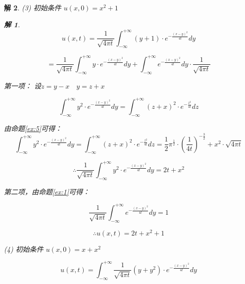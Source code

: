 \documentclass[12pt,a4paper]{article}
\newtheorem*{solution}{解}
\begin{document}
\begin{solution}
	
(3) 初始条件 \( u(x,0) = x^2 + 1 \)
			\begin{solution}
	
\begin{equation*}
 u(x,t)=\frac{1}{\sqrt{4\pi t}}\int_{-\infty}^{+\infty}(y+1)\cdot e^{-\frac{(x-y)^2}{4t}}dy
\end{equation*}

\begin{equation*}
	=\frac{1}{\sqrt{4\pi t}}\int_{-\infty}^{+\infty} y\cdot e^{-\frac{(x-y)^2}{4t}}dy+\int_{-\infty}^{+\infty} e^{-\frac{(x-y)^2}{4t}}dy\cdot \frac{1}{\sqrt{4\pi t}}
\end{equation*}

第一项：
设$z=y-x\quad y=z+x$



\begin{equation*}
	\int_{-\infty}^{+\infty} y^2 \cdot e^{-\frac{(x-y)^2}{4t}} dy	=\int_{-\infty}^{+\infty}(z+x)^2 \cdot e^{-\frac{z^2}{4t}} dz
\end{equation*}


由命题\eqref{ex:5}可得：
\begin{equation*}
	\int_{-\infty}^{+\infty} y^2 \cdot e^{-\frac{(x-y)^2}{4t}} dy	=\int_{-\infty}^{+\infty}(z+x)^2 \cdot e^{-\frac{z^2}{4t}} dz=\frac{1}{2}\pi^{\frac{1}{2}}\cdot\left(\frac{1}{4t}\right)^{-\frac{3}{2}} +x^2 \cdot \sqrt{4\pi t}
\end{equation*}

\begin{equation*}
	\therefore \frac{1}{\sqrt{4\pi t}}\int_{-\infty}^{+\infty} y^2 \cdot e^{-\frac{(x-y)^2}{4t}} dy=2t+x^2
\end{equation*}

第二项，由命题\eqref{ex:1}可得：

\begin{equation*}
	\frac{1}{\sqrt{4\pi t}}\int_{-\infty}^{+\infty} e^{-\frac{(x-y)^2}{4t}} dy=1
\end{equation*}
	
	\begin{equation*}
		\therefore u(x,t) = 2t + x^2 + 1
	\end{equation*}
	
	
	
\end{solution}
	
	
(4) 初始条件 \( u(x,0) = x + x^2 \)
	
\begin{equation*}
 u(x,t) = \int_{-\infty}^{+\infty} \frac{1}{\sqrt{4\pi t}} (y + y^2) \cdot e^{-\frac{(x-y)^2}{4t}} dy
\end{equation*}


\end{solution}
\end{document}
